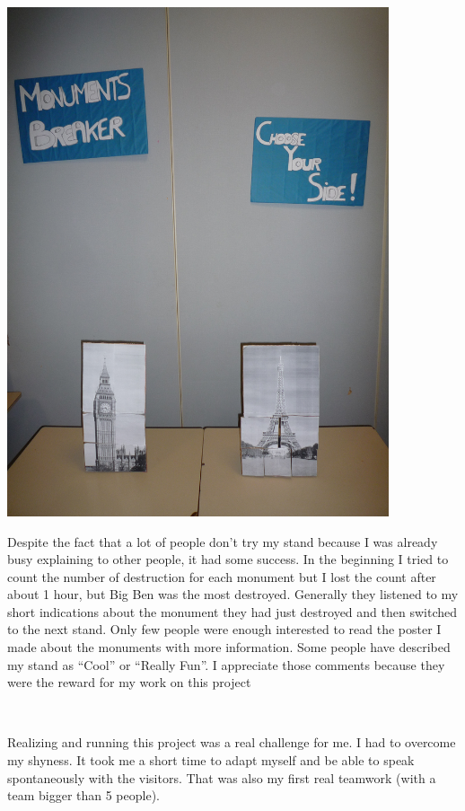 \documentclass[11pt;a4paper]{report}
\begin{document}
\begin{center}
\includegraphics[height=15cm]{images/MB2}
\end{center}

    Despite the fact that a lot of people don’t try my stand because I was already busy explaining to other people, it had some success. In the beginning I tried to count the number of destruction for each monument but I lost the count after about 1 hour, but Big Ben was the most destroyed. Generally they listened to my short indications about the monument they had just destroyed and then switched to the next stand. Only few people were enough interested to read the poster I made about the monuments with more information. Some people have described my stand as “Cool” or “Really Fun”. I appreciate those comments because they were the reward for my work on this project

~

    Realizing and running this project was a real challenge for me. I had to overcome my shyness. It took me a short time to adapt myself and be able to speak spontaneously with the visitors. That was also my first real teamwork (with a team bigger than 5 people).
\end{document}
